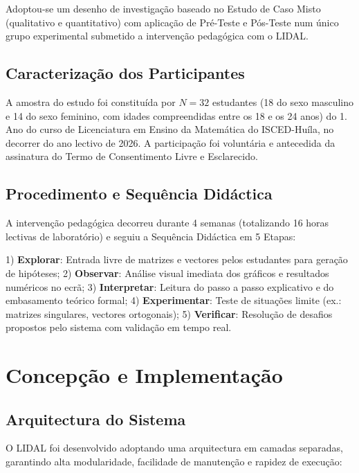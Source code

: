 \documentclass[conference]{IEEEtran}
\begin{document}
Adoptou-se um desenho de investigação baseado no Estudo de Caso Misto (qualitativo e quantitativo) com aplicação de Pré-Teste e Pós-Teste num único grupo experimental submetido a intervenção pedagógica com o LIDAL.

\subsection{Caracterização dos Participantes}

A amostra do estudo foi constituída por $N = 32$ estudantes (18 do sexo masculino e 14 do sexo feminino, com idades compreendidas entre os 18 e os 24 anos) do 1.\textordmasculine{} Ano do curso de Licenciatura em Ensino da Matemática do ISCED-Huíla, no decorrer do ano lectivo de 2026. A participação foi voluntária e antecedida da assinatura do Termo de Consentimento Livre e Esclarecido.

\subsection{Procedimento e Sequência Didáctica}

A intervenção pedagógica decorreu durante 4 semanas (totalizando 16 horas lectivas de laboratório) e seguiu a Sequência Didáctica em 5 Etapas:

1) \textbf{Explorar}: Entrada livre de matrizes e vectores pelos estudantes para geração de hipóteses; 2) \textbf{Observar}: Análise visual imediata dos gráficos e resultados numéricos no ecrã; 3) \textbf{Interpretar}: Leitura do passo a passo explicativo e do embasamento teórico formal; 4) \textbf{Experimentar}: Teste de situações limite (ex.: matrizes singulares, vectores ortogonais); 5) \textbf{Verificar}: Resolução de desafios propostos pelo sistema com validação em tempo real.

\section{Concepção e Implementação}

\subsection{Arquitectura do Sistema}

O LIDAL foi desenvolvido adoptando uma arquitectura em camadas separadas, garantindo alta modularidade, facilidade de manutenção e rapidez de execução:
\end{document}
